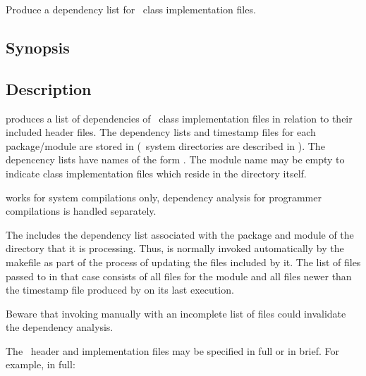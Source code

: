 

Produce a dependency list for \aipspp\ class implementation files.

\subsection*{Synopsis}

\begin{synopsis}
\end{synopsis}

\subsection*{Description}

 produces a list of dependencies of \aipspp\ class implementation
files in relation to their included header files.  The dependency lists and
timestamp files for each package/module are stored in 
(\aipspp\ system directories are described in ).  The
depencency lists have names of the form
.  The module name may be empty to
indicate class implementation files which reside in the 
directory itself.

 works for system compilations only, dependency analysis for
programmer compilations is handled separately.

The   includes the dependency
list associated with the package and module of the directory that it is
processing.  Thus,  is normally invoked automatically by the
 makefile as part of the process of updating the files
included by it.  The list of files passed to  in that case
consists of all  files for the module and all  files newer
than the  timestamp file produced by  on its last
execution.

Beware that invoking  manually with an incomplete list of files
could invalidate the dependency analysis.

The \cplusplus\ header and implementation files may be specified in full or
in brief.  For example, in full:

